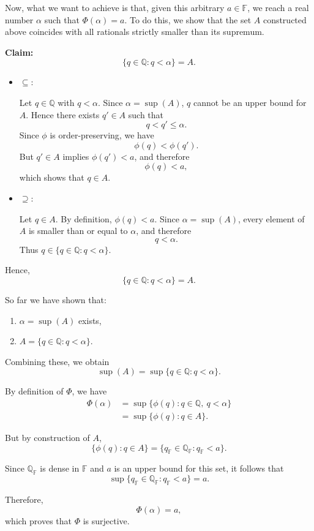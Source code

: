 \begin{bookproof}
Now, what we want to achieve is that, given this arbitrary $a \in \mathbb{F}$, we reach a real number $\alpha$ such that $\Phi(\alpha) = a$. To do this, we show that the set $A$ constructed above coincides with all rationals strictly smaller than its supremum.

\medskip
\textbf{Claim:}
$$
\{q \in \mathbb{Q} : q < \alpha\} = A.
$$

\begin{itemize}
\item $\subseteq$:

Let $q \in \mathbb{Q}$ with $q < \alpha$. Since $\alpha = \sup(A)$, $q$ cannot be an upper bound for $A$. Hence there exists $q' \in A$ such that
$$
q < q' \le \alpha.
$$
Since $\phi$ is order-preserving, we have
$$
\phi(q) < \phi(q').
$$
But $q' \in A$ implies $\phi(q') < a$, and therefore
$$
\phi(q) < a,
$$
which shows that $q \in A$.

\item $\supseteq$:

Let $q \in A$. By definition, $\phi(q) < a$. Since $\alpha = \sup(A)$, every element of $A$ is smaller than or equal to $\alpha$, and therefore
$$
q < \alpha.
$$
Thus $q \in \{q \in \mathbb{Q} : q < \alpha\}$.
\end{itemize}

Hence,
$$
\{q \in \mathbb{Q} : q < \alpha\} = A.
$$

So far we have shown that:
\begin{enumerate}
\item $\alpha = \sup(A)$ exists,
\item $A = \{q \in \mathbb{Q} : q < \alpha\}$.
\end{enumerate}

Combining these, we obtain
$$
\sup(A) = \sup\{q \in \mathbb{Q} : q < \alpha\}.
$$

By definition of $\Phi$, we have
\begin{align*}
\Phi(\alpha)
&= \sup\{\phi(q) : q \in \mathbb{Q},\ q < \alpha\} \\
&= \sup\{\phi(q) : q \in A\}.
\end{align*}

But by construction of $A$,
$$
\{\phi(q) : q \in A\} = \{q_\mathbb{F} \in \mathbb{Q_F} : q_\mathbb{F} < a\}.
$$

Since $\mathbb{Q_F}$ is dense in $\mathbb{F}$ and $a$ is an upper bound for this set, it follows that
$$
\sup\{q_\mathbb{F} \in \mathbb{Q_F} : q_\mathbb{F} < a\} = a.
$$

Therefore,
$$
\Phi(\alpha) = a,
$$
which proves that $\Phi$ is surjective.
\end{bookproof}

